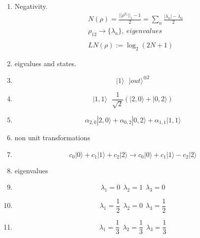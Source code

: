 \documentclass[12pt]{article}
\begin{document}
\begin{enumerate}
\item Negativity.
\begin{align*}
& N(\rho) = \frac{||\rho^{T_{1}}||_{1} - 1}{2}  =\sum_{n}  \frac{|\lambda_{n}| - \lambda_{n}}{2} \\
& \rho_{12}   \rightarrow  \{ \lambda_{n} \}, \ eigenvalues  \\
\\
& LN(\rho) := \log_{2}(2N + 1)
\end{align*}


\item eigvalues and states.

\item $$ |1\rangle   \ \ \ |out\rangle^{\otimes 2} $$

\item $$ |1,1\rangle   \ \ \ \frac{1}{\sqrt{2}}(|2,0\rangle + |0,2\rangle)  $$

\item $$  \alpha_{2,0}|2,0\rangle + \alpha_{0,2}|0,2\rangle + \alpha_{1,1}|1,1\rangle    $$

\item non unit transformations
\item $$  c_{0}|0\rangle  + c_{1}|1\rangle + c_{2}|2\rangle  \rightarrow  c_{0}|0\rangle  + c_{1}|1\rangle - c_{2}|2\rangle  $$

\item eigenvalues
\item $$  \lambda_{1} = 0  \ \ \lambda_{2} = 1  \ \  \lambda_{3} = 0 $$
\item $$  \lambda_{1} = \frac{1}{2}  \ \ \lambda_{2} = 0  \ \  \lambda_{3} = \frac{1}{2} $$
\item $$  \lambda_{1} = \frac{1}{3}  \ \ \lambda_{2} = \frac{1}{3}  \ \  \lambda_{3} = \frac{1}{3} $$



\end{enumerate}
\end{document}
